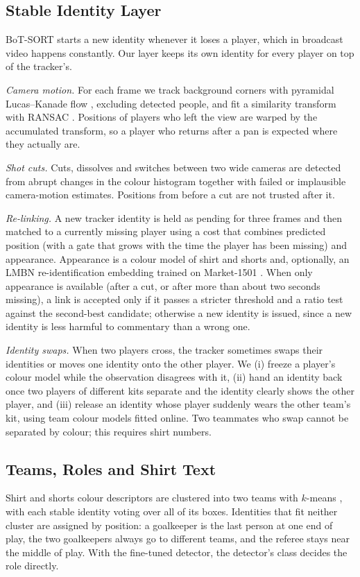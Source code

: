 \documentclass[conference]{IEEEtran}
\begin{document}
\subsection{Stable Identity Layer}
BoT-SORT starts a new identity whenever it loses a player, which in broadcast video happens constantly. Our layer keeps its own identity for every player on top of the tracker's.

\textit{Camera motion.} For each frame we track background corners \cite{shi1994good} with pyramidal Lucas--Kanade flow \cite{lucas1981iterative}, excluding detected people, and fit a similarity transform with RANSAC \cite{fischler1981ransac}. Positions of players who left the view are warped by the accumulated transform, so a player who returns after a pan is expected where they actually are.

\textit{Shot cuts.} Cuts, dissolves and switches between two wide cameras are detected from abrupt changes in the colour histogram together with failed or implausible camera-motion estimates. Positions from before a cut are not trusted after it.

\textit{Re-linking.} A new tracker identity is held as pending for three frames and then matched to a currently missing player using a cost that combines predicted position (with a gate that grows with the time the player has been missing) and appearance. Appearance is a colour model of shirt and shorts and, optionally, an LMBN re-identification embedding \cite{herzog2021lightweight} trained on Market-1501 \cite{zheng2015scalable}. When only appearance is available (after a cut, or after more than about two seconds missing), a link is accepted only if it passes a stricter threshold and a ratio test against the second-best candidate; otherwise a new identity is issued, since a new identity is less harmful to commentary than a wrong one.

\textit{Identity swaps.} When two players cross, the tracker sometimes swaps their identities or moves one identity onto the other player. We (i) freeze a player's colour model while the observation disagrees with it, (ii) hand an identity back once two players of different kits separate and the identity clearly shows the other player, and (iii) release an identity whose player suddenly wears the other team's kit, using team colour models fitted online. Two teammates who swap cannot be separated by colour; this requires shirt numbers.

\subsection{Teams, Roles and Shirt Text}
Shirt and shorts colour descriptors are clustered into two teams with $k$-means \cite{lloyd1982least}, with each stable identity voting over all of its boxes. Identities that fit neither cluster are assigned by position: a goalkeeper is the last person at one end of play, the two goalkeepers always go to different teams, and the referee stays near the middle of play. With the fine-tuned detector, the detector's class decides the role directly.
\end{document}
